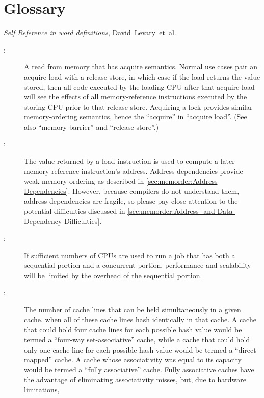 
\chapter{Glossary}
%
	 {\emph{Self Reference in word definitions},
	        David~Levary~et~al.}

\begin{description}
\item[:]
	A read from memory that has acquire semantics.
	Normal use cases pair an acquire load with a release store,
	in which case if the load returns the value stored, then all
	code executed by the loading CPU after that acquire load will
	see the effects of all memory-reference instructions executed
	by the storing CPU prior to that release store.
	Acquiring a lock provides similar memory-ordering semantics,
	hence the ``acquire'' in ``acquire load''.
	(See also ``memory barrier'' and ``release store''.)
\item[:]
	The value returned by a load instruction is used to compute
	a later memory-reference instruction's address.
	Address dependencies provide weak memory ordering as described
	in \cref{sec:memorder:Address Dependencies}.
	However, because compilers do not understand them, address
	dependencies are fragile, so please pay close attention to the
	potential difficulties discussed in
	\cref{sec:memorder:Address- and Data-Dependency Difficulties}.
\item[:]
	If sufficient numbers of CPUs are used to run a job that has both
	a sequential portion and a concurrent portion, performance and
	scalability will be limited by the overhead of the sequential
	portion.
\item[:]
	The number of cache lines that can be held simultaneously in
	a given cache, when all of these cache lines hash identically
	in that cache.
	A cache that could hold four cache lines for each possible
	hash value would be termed a ``four-way set-associative'' cache,
	while a cache that could hold only one cache line for each
	possible hash value would be termed a ``direct-mapped'' cache.
	A cache whose associativity was equal to its capacity would
	be termed a ``fully associative'' cache.
	Fully associative caches have the advantage of eliminating
	associativity misses, but, due to hardware limitations,

\end{description}
